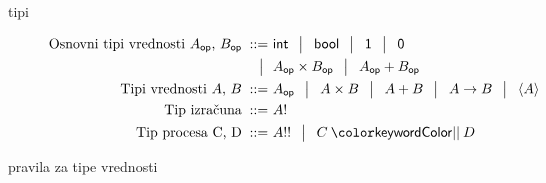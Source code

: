 \documentclass{beamer}
\theoremstyle{definition} %
\theoremstyle{plain} %
\begin{document}
	\begin{frame}{tipi}
	\begin{figure}[tb]
		\parbox{\textwidth}{
			\centering
			\tiny
			\begin{align*}
			\text{Osnovni tipi vrednosti $A_\op$, $B_\op$}
			\bnfis & \tysym{int} \,\bnfor\! \tysym{bool} \,\bnfor\! \tyunit \,\bnfor\! \tyempty \\
			\bnfor & \typrod{A_\op}{B_\op} \,\bnfor\! \tysum{A_\op}{B_\op}
			\\%
			\text{Tipi vrednosti $A$, $B$}
			\bnfis & A_\op \, \bnfor\! \typrod{A}{B} \,\bnfor\! \tysum{A}{B} \,\bnfor\! \tyfun{A}{B} \,\bnfor\! \typromise{A}
			\\
			\text{Tip izračuna} \bnfis& \tycomp{A}
			\\
			\text{Tip procesa \tyC, \tyD}  \bnfis & \tyrun{A} \,\bnfor\! \typar{\tyC}{\tyD}
			\end{align*}
		} 
	\end{figure}
	\end{frame}

	\begin{frame}{pravila za tipe vrednosti}
		\begin{figure}[tp]
			\centering
			\tiny
			\begin{mathpar}
				\qquad
				\qquad
				\quad
				\quad
				\coopinfer{}{
				}{
					\Gamma \types \tmunit : \tyunit
				}
				\\
				\quad
				\quad
				\quad
				\\
				\quad
			\end{mathpar}
		\end{figure}
	\end{frame}
\end{document}
